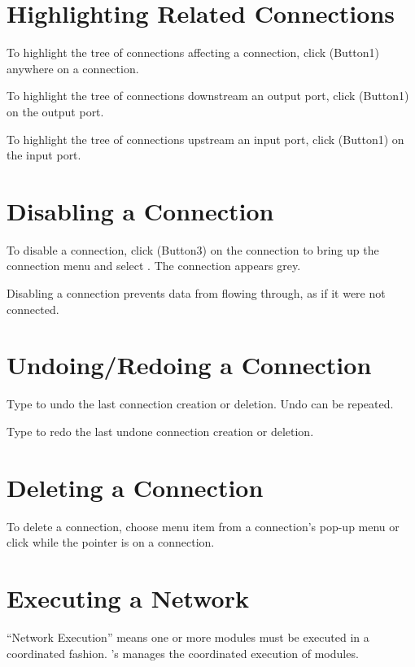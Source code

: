 \section{Highlighting Related Connections}
\label{sec:highlightconnect}

To highlight the tree of connections affecting a connection, click
\keyboard(Button1) anywhere on a connection.

To highlight the tree of connections downstream an output port,
click \keyboard(Button1) on the output port.

To highlight the tree of connections upstream an input port,
click \keyboard(Button1) on the input port.

\section{Disabling a Connection}
\label{sec:disableconnect}

To disable a connection, click \keyboard(Button3) on the connection to
bring up the connection menu and select . The
connection appears grey.

Disabling a connection prevents data from flowing through, as if it were
not connected.

\section{Undoing/Redoing a Connection}
\label{sec:undomod}

Type  to undo the last connection creation or deletion.
Undo can be repeated.

Type  to redo the last undone connection creation or
deletion.
 
\section{Deleting a Connection}
\label{sec:deleteconnections}

To delete a connection, choose menu item  from a
connection's pop-up menu or click  while the
pointer is on a connection.

\section{Executing a Network}
\label{sec:executenet}

``Network Execution'' means one or more modules must be executed in a
coordinated fashion. 
\sr{}'s  manages the coordinated execution of modules.


